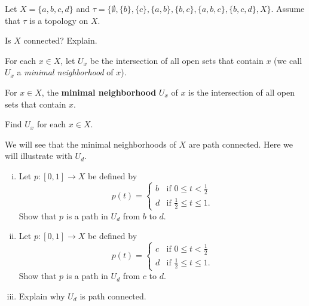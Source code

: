 \begin{activity} \label{act:minimal_nbhds} Let $X = \{a,b,c,d\}$ and $\tau = \{\emptyset, \{b\}, \{c\}, \{a,b\}, \{b,c\}, \{a,b,c\}, \{b,c,d\}, X\}$. Assume that $\tau$ is a topology on $X$. 
\ba
\item Is $X$ connected? Explain.

\item For each $x \in X$, let $U_x$ be the intersection of all open sets that contain $x$ (we call $U_x$ a \emph{minimal neighborhood} of $x$). 

\begin{definition} \label{def:min_nghb} For $x \in X$, the \textbf{minimal neighborhood} $U_x$ of $x$ is the intersection of all open sets that contain $x$. 
\end{definition}

Find $U_x$ for each $x \in X$. 

\item We will see that the minimal neighborhoods of $X$ are path connected. Here we will illustrate with $U_d$. 

	\begin{enumerate}[i.] 
	\item Let $p : [0,1] \to X$ be defined by 
\[p(t) = \begin{cases} b &\text{if } 0 \leq t < \frac{1}{2} \\ d &\text{if } \frac{1}{2} \leq t \leq 1. \end{cases}\]
Show that $p$ is a path in $U_d$ from $b$ to $d$.

	\item Let $p : [0,1] \to X$ be defined by 
\[p(t) = \begin{cases} c &\text{if } 0 \leq t < \frac{1}{2} \\ d &\text{if } \frac{1}{2} \leq t \leq 1. \end{cases}\]
Show that $p$ is a path in $U_d$ from $c$ to $d$.

	\item Explain why $U_d$ is path connected.
	
	\end{enumerate} 

\ea

\end{activity}

